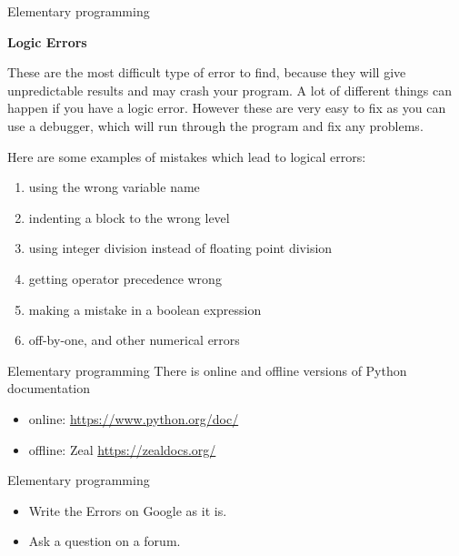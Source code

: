 \begin{frame}[fragile]{Elementary programming}
\begin{center}{\bf Logic Errors}\end{center}
These are the most difficult type of error to find, because they will give unpredictable results and may crash your program.  A lot of different things can happen if you have a logic error. However these are very easy to fix as you can use a debugger, which will run through the program and fix any problems.


Here are some examples of mistakes which lead to logical errors: 
\begin{enumerate}[<+->]
  \item using the wrong variable name
  \item indenting a block to the wrong level
  \item using integer division instead of floating point division
  \item getting operator precedence wrong
  \item  making a mistake in a boolean expression
  \item off-by-one, and other numerical errors
\end{enumerate}
\end{frame}
\begin{frame}[fragile]{Elementary programming}
   There is online and offline versions of Python documentation 
   \begin{itemize}
     \item online: \url{https://www.python.org/doc/}
     \item offline: Zeal \url{https://zealdocs.org/}
   \end{itemize}
  \end{frame}
  \begin{frame}[fragile]{Elementary programming}
  \begin{itemize}
    \item Write the Errors on Google as it is.
    \item Ask a question on a forum.
  \end{itemize}
  \end{frame}


